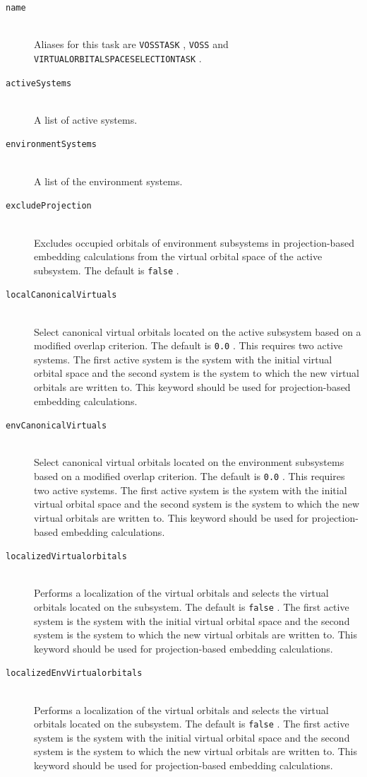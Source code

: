\documentclass[bibliography=totocnumbered,a4paper,10pt,oneside]{scrbook}
\newcommand{\ttt}[1]{%
  \begingroup\setlength{\fboxsep}{1pt}%
  \colorbox{serenity-green!30}{\texttt{\hspace*{2pt}\vphantom{(g}#1\hspace*{2pt}}}%
  \endgroup
}
\begin{document}
\begin{description}
	\item[\texttt{name}]\hfill \\
    Aliases for this task are \ttt{VOSSTASK}, \ttt{VOSS} and \ttt{VIRTUALORBITALSPACESELECTIONTASK}.
	\item[\texttt{activeSystems}]\hfill \\
	A list of active systems.
	\item[\texttt{environmentSystems}]\hfill \\
	A list of the environment systems.
  \item[\texttt{excludeProjection}]\hfill\\
  Excludes occupied orbitals of environment subsystems in projection-based embedding calculations from the virtual orbital space of the active subsystem. The default is \ttt{false}. 
  \item[\texttt{localCanonicalVirtuals}]\hfill\\
  Select canonical virtual orbitals located on the active subsystem based on a modified overlap criterion. The default is \ttt{0.0}. This requires two active systems. The first active system is the system with the initial virtual orbital space and the second system is the system to which the new virtual orbitals are written to. This keyword should be used for projection-based embedding calculations.
  \item[\texttt{envCanonicalVirtuals}]\hfill\\
  Select canonical virtual orbitals located on the environment subsystems based on a modified overlap criterion. The default is \ttt{0.0}. This requires two active systems. The first active system is the system with the initial virtual orbital space and the second system is the system to which the new virtual orbitals are written to. This keyword should be used for projection-based embedding calculations.
  \item[\texttt{localizedVirtualorbitals}]\hfill\\
  Performs a localization of the virtual orbitals and selects the virtual orbitals located on the subsystem. The default is \ttt{false}. The first active system is the system with the initial virtual orbital space and the second system is the system to which the new virtual orbitals are written to. This keyword should be used for projection-based embedding calculations.
  \item[\texttt{localizedEnvVirtualorbitals}]\hfill\\
  Performs a localization of the virtual orbitals and selects the virtual orbitals located on the subsystem. The default is \ttt{false}. The first active system is the system with the initial virtual orbital space and the second system is the system to which the new virtual orbitals are written to. This keyword should be used for projection-based embedding calculations.
\end{description}
\end{document}

